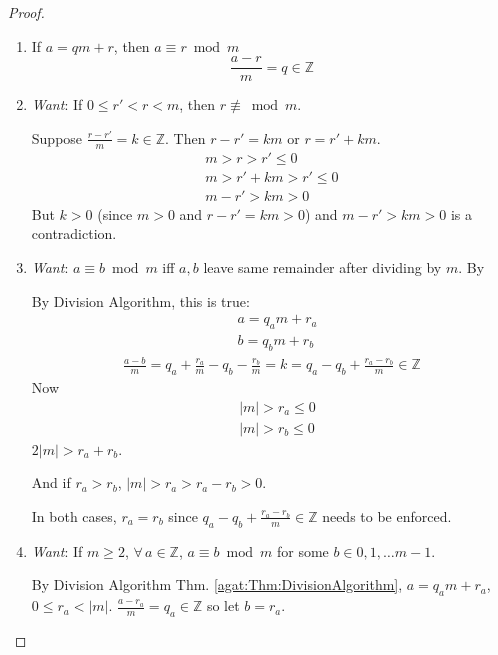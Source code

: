 \begin{proof}
\begin{enumerate}
	\item If $a=qm +r$, then $a \equiv r \bmod{m}$ 
	\[
	\frac{a-r}{m} = q \in \mathbb{Z}  
	\]
	\item  \emph{Want}: If $0\leq r' <r <m$, then $r \not\equiv\bmod{m}$.  
	
	Suppose $\frac{r-r'}{m} = k \in \mathbb{Z}$.  Then $r-r' = km$ or $r=r' + km$.  
	\[
	\begin{gathered}
	m > r > r' \leq 0 \\
	m > r' + km > r' \leq 0 \\
	m-r' > km > 0 
	\end{gathered}
	\]
	But $k>0$ (since $m>0$ and $r-r' = km >0$) and $m-r' > km > 0$ is a contradiction.  
	
	\item \emph{Want}: $a \equiv b \bmod{m}$ iff $a,b$ leave same remainder after dividing by $m$.  By 
	
	By Division Algorithm, this is true: 
	\[
	\begin{aligned}
	& a=q_a m + r_a \\ 
	 & b= q_b m + r_b 
	\end{aligned}
	\] 
	\[
	\begin{gathered}
	\frac{a-b}{m} = q_a + \frac{r_a}{m} - q_b - \frac{r_b}{m} = k = q_a - q_b + \frac{r_a - r_b}{m} \in \mathbb{Z}
	\end{gathered}
	\]
	Now 
	\[
	\begin{aligned}
	& |m| > r_a \leq 0 \\ 
	& |m| > r_b \leq 0 
	\end{aligned}
		\]
		$2|m| > r_a + r_b$.  
		
		And if $r_a > r_b$, $|m| > r_a > r_a -r_b > 0$.  
		
		In both cases, $r_a=r_b$ since $q_a - q_b + \frac{r_a - r_b}{m} \in \mathbb{Z}$ needs to be enforced.   
		
	\item \emph{Want}: If $m\geq 2$, $\forall \, a \in \mathbb{Z}$, $a \equiv b \bmod{m}$ for some $b\in 0,1,\dots m-1$.  
	
	By Division Algorithm Thm. \ref{agat:Thm:DivisionAlgorithm}, $a = q_a m + r_a$, \, $0 \leq r_a < |m|$.  $\frac{a-r_a}{m} = q_a \in \mathbb{Z}$ so let $b= r_a$.  
	
\end{enumerate}	
\end{proof}

